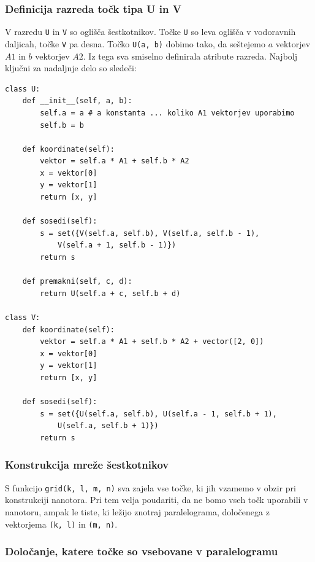 \documentclass[a4paper, 10 pt, titlepage]{article}
\begin{document}
\subsubsection{Definicija razreda točk tipa U in V}

V razredu \texttt{U} in \texttt{V} so oglišča šestkotnikov. Točke \texttt{U} so leva oglišča v vodoravnih daljicah, točke \texttt{V} pa desna. Točko \texttt{U(a, b)} dobimo tako, da seštejemo $a$ vektorjev $A1$ in $b$ vektorjev $A2$. Iz tega sva smiselno definirala atribute razreda. Najbolj ključni za nadaljnje delo so sledeči:

\begin{verbatim}
class U:
    def __init__(self, a, b):
        self.a = a # a konstanta ... koliko A1 vektorjev uporabimo
        self.b = b

    def koordinate(self):
        vektor = self.a * A1 + self.b * A2
        x = vektor[0]
        y = vektor[1]
        return [x, y]

    def sosedi(self):
        s = set({V(self.a, self.b), V(self.a, self.b - 1), 
        	V(self.a + 1, self.b - 1)})
        return s

    def premakni(self, c, d):
        return U(self.a + c, self.b + d)

class V:       
    def koordinate(self):
        vektor = self.a * A1 + self.b * A2 + vector([2, 0])
        x = vektor[0]
        y = vektor[1]
        return [x, y]
    
    def sosedi(self):
        s = set({U(self.a, self.b), U(self.a - 1, self.b + 1), 
        	U(self.a, self.b + 1)})
        return s
\end{verbatim}

\subsubsection{Konstrukcija mreže šestkotnikov}

S funkcijo \texttt{grid(k, l, m, n)} sva zajela vse točke, ki jih vzamemo v obzir pri konstrukciji nanotora. Pri tem velja poudariti, da ne bomo vseh točk uporabili v nanotoru, ampak le tiste, ki ležijo znotraj paralelograma, določenega z vektorjema \texttt{(k, l)} in \texttt{(m, n)}. 


\subsubsection{Določanje, katere točke so vsebovane v paralelogramu}
\end{document}
